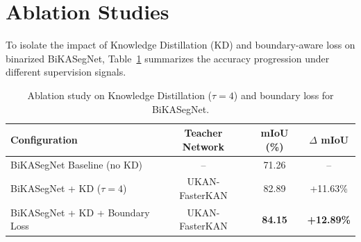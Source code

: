 \documentclass[a4paper]{report}
\begin{document}
\begin{table}[h!]
\centering
\caption{BiKASegNet CPU SIMD optimization journey (x86\_64, 12 Threads, AVX2 SIMD).}
\label{tab:cpu_optimization_journey}
\end{table}

\section{Ablation Studies}
\label{sec:ablations}

To isolate the impact of Knowledge Distillation (KD) and boundary-aware loss on binarized BiKASegNet, Table~\ref{tab:kd_ablation} summarizes the accuracy progression under different supervision signals.

\begin{table}[h!]
\centering
\small
\begin{tabular}{lccc}
\toprule
\textbf{Configuration} & \textbf{Teacher Network} & \textbf{mIoU (\%)} & \textbf{$\Delta$ mIoU} \\
\midrule
BiKASegNet Baseline (no KD) & -- & 71.26 & -- \\
BiKASegNet + KD ($\tau=4$) & UKAN-FasterKAN & 82.89 & +11.63\% \\
BiKASegNet + KD + Boundary Loss & UKAN-FasterKAN & \textbf{84.15} & \textbf{+12.89\%} \\
\bottomrule
\end{tabular}
\caption{Ablation study on Knowledge Distillation ($\tau=4$) and boundary loss for BiKASegNet.}
\label{tab:kd_ablation}
\end{table}
\end{document}
